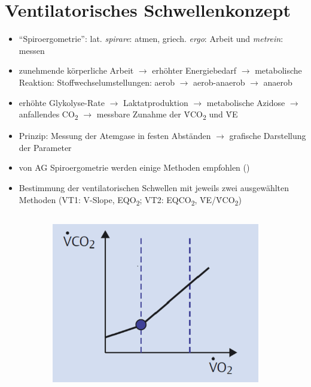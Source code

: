 \documentclass[colorBG,slideColor,8pt]{beamer}
\newcommand{\eqotwo}{EQO\textsubscript{2}}
\newcommand{\eqcotwo}{EQCO\textsubscript{2}}
\newcommand{\vcotwo}{\.{V}CO\textsubscript{2}}
\newcommand{\ve}{\.{V}E}
\begin{document}

\section{Ventilatorisches Schwellenkonzept}

\begin{frame}
\begin{itemize}
	\item "`Spiroergometrie"': lat. \textsl{spirare}: atmen, griech. \textsl{ergo}: Arbeit und \textsl{metrein}: messen
	\item zunehmende körperliche Arbeit $\rightarrow$ erhöhter Energiebedarf $\rightarrow$ metabolische Reaktion: Stoffwechselumstellungen: aerob $\rightarrow$ aerob-anaerob $\rightarrow$ anaerob
	\item erhöhte Glykolyse-Rate $\rightarrow$ Laktatproduktion $\rightarrow$ metabolische Azidose $\rightarrow$ anfallendes CO\textsubscript{2} $\rightarrow$ messbare Zunahme der \vcotwo{} und \ve
	\item Prinzip: Messung der Atemgase in festen Abständen $\rightarrow$ grafische Darstellung der Parameter
	\item von AG Spiroergometrie werden einige Methoden empfohlen (\cite{Westhoff.2012})
	\item Bestimmung der ventilatorischen Schwellen mit jeweils zwei ausgewählten Methoden (VT1: V-Slope, \eqotwo; VT2: \eqcotwo, \ve/\vcotwo)
\end{itemize}
\begin{columns}
\begin{column}{\linewidth}
\begin{figure}[H]
	\begin{subfigure}[c]{0.2\linewidth}
		\centering
		\includegraphics[width=0.8\linewidth]{Bilder/vslope.png}

\end{subfigure}
\end{figure}
\end{column}
\end{columns}
\end{frame}
\end{document}

